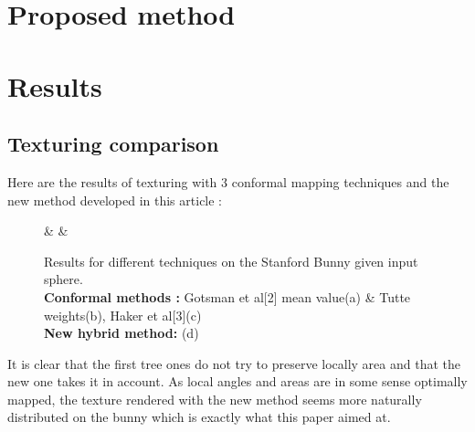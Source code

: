 \documentclass[11pt,a4paper]{article}
\begin{document}
\section{Proposed method}

\section{Results}

\subsection{Texturing comparison}

Here are the results of texturing with 3 conformal mapping techniques and the new method developed in this article :

\begin{figure}[H]
     &
    &
    \caption{Results for different techniques on the Stanford Bunny given input sphere.\\
        \textbf{Conformal methods :} Gotsman et al[2] mean value(a) \& Tutte weights(b), Haker et al[3](c)\\
        \textbf{New hybrid method:} (d)}
\end{figure}

It is clear that the first tree ones do not try to preserve locally area and that the new one takes it in account. As local angles and areas are in some sense optimally mapped, the texture rendered with the new method seems more naturally distributed on the bunny which is exactly what this paper aimed at.
\end{document}
